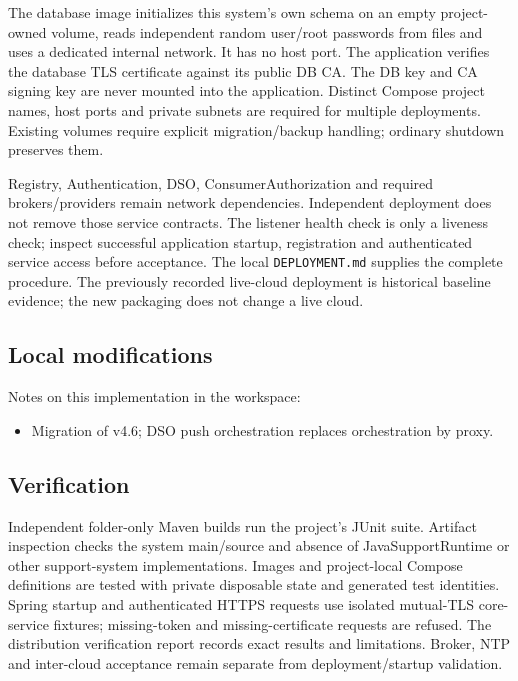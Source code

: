 \documentclass[a4paper]{arrowhead}
\begin{document}
The database image initializes this system's own schema on an empty project-owned volume, reads independent random user/root passwords from files and uses a dedicated internal network. It has no host port. The application verifies the database TLS certificate against its public DB CA. The DB key and CA signing key are never mounted into the application. Distinct Compose project names, host ports and private subnets are required for multiple deployments. Existing volumes require explicit migration/backup handling; ordinary shutdown preserves them.

Registry, Authentication, DSO, ConsumerAuthorization and required brokers/providers remain network dependencies. Independent deployment does not remove those service contracts. The listener health check is only a liveness check; inspect successful application startup, registration and authenticated service access before acceptance. The local \texttt{DEPLOYMENT.md} supplies the complete procedure. The previously recorded live-cloud deployment is historical baseline evidence; the new packaging does not change a live cloud.

\subsection{Local modifications}
\label{sec:local}

Notes on this implementation in the workspace:
\begin{itemize}
  \item Migration of v4.6; DSO push orchestration replaces orchestration by proxy.
\end{itemize}

\subsection{Verification}

Independent folder-only Maven builds run the project's JUnit suite. Artifact inspection checks the system main/source and absence of JavaSupportRuntime or other support-system implementations. Images and project-local Compose definitions are tested with private disposable state and generated test identities. Spring startup and authenticated HTTPS requests use isolated mutual-TLS core-service fixtures; missing-token and missing-certificate requests are refused. The distribution verification report records exact results and limitations. Broker, NTP and inter-cloud acceptance remain separate from deployment/startup validation.
\end{document}
